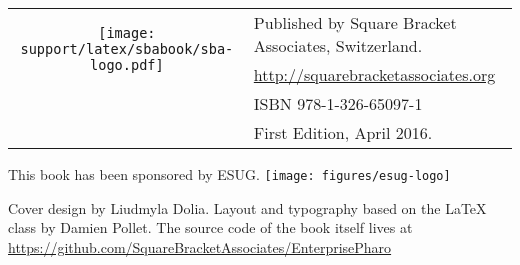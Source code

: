 \documentclass[10pt,twoside,english,showtrims]{support/latex/sbabook/sbabook}
\begin{document}
{  \vfill

  \begin{tabular}{@{}c@{\quad}l}
    \multirow{2}{*}{\texttt{[image: support/latex/sbabook/sba-logo.pdf]}}
    & Published by Square Bracket Associates, Switzerland. \\
    & \url{http://squarebracketassociates.org} \\[\smallskipamount]
    & ISBN 978-1-326-65097-1 \\
    & First Edition, April 2016. \\
  \end{tabular}
  \medskip

  This book has been sponsored by ESUG. \texttt{[image: figures/esug-logo]}

  Cover design by Liudmyla Dolia. Layout and typography based on the
   \LaTeX{} class by Damien Pollet. The source code
  of the book itself lives at
  \url{https://github.com/SquareBracketAssociates/EnterprisePharo} }


\frontmatter
\pagestyle{plain}

\tableofcontents*
\clearpage\listoffigures


\mainmatter









\backmatter
\end{document}
